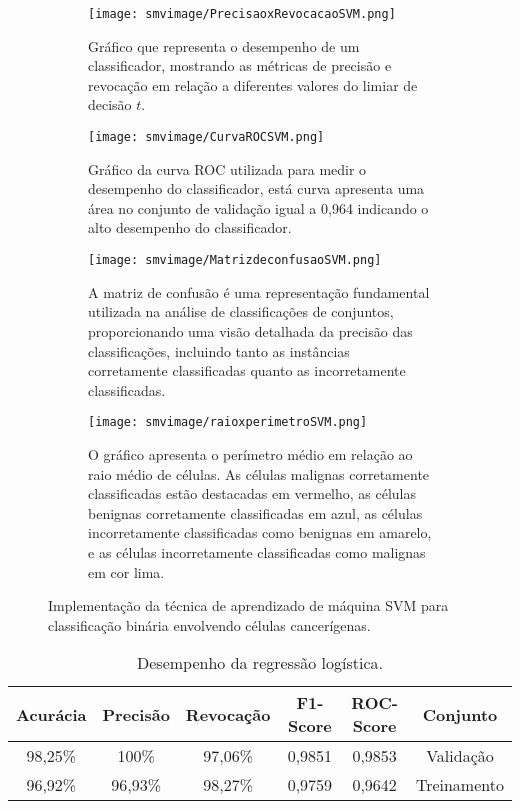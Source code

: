 \documentclass{pssbmac}
\begin{document}
\begin{figure}[H]
    \centering
    \begin{subfigure}[t]{0.49\textwidth}
        \centering
        \texttt{[image: smvimage/PrecisaoxRevocacaoSVM.png]}
        \caption{Gráfico que representa o desempenho de um classificador, mostrando as métricas de precisão e revocação em relação a diferentes valores do limiar de decisão $t$.}
        \label{subfig1svm}
    \end{subfigure}
    \hfill
    \begin{subfigure}[t]{0.49\textwidth}
        \centering
        \texttt{[image: smvimage/CurvaROCSVM.png]}
        \caption{Gráfico da curva ROC utilizada para medir o desempenho do classificador, está curva apresenta uma área no conjunto de validação igual a 0,964 indicando o alto desempenho do classificador.}
        \label{subfig2svm}
    \end{subfigure}
    \bigskip
    \begin{subfigure}[b]{0.49\textwidth}
        \centering
        \texttt{[image: smvimage/MatrizdeconfusaoSVM.png]}
        \caption{A matriz de confusão é uma representação fundamental utilizada na análise de classificações de conjuntos, proporcionando uma visão detalhada da precisão das classificações, incluindo tanto as instâncias corretamente classificadas quanto as incorretamente classificadas.}
        \label{subfig3svm}
    \end{subfigure}
    \hfill
    \begin{subfigure}[b]{0.49\textwidth}
        \centering
        \texttt{[image: smvimage/raioxperimetroSVM.png]}

        \caption{O gráfico apresenta o perímetro médio em relação ao raio médio de células. As células malignas corretamente classificadas estão destacadas em vermelho, as células benignas corretamente classificadas em azul, as células incorretamente classificadas como benignas em amarelo, e as células incorretamente classificadas como malignas em cor lima.}
        \label{subfig4svm}
    \end{subfigure}
    \caption{Implementação da técnica de aprendizado de máquina SVM para classificação binária envolvendo células cancerígenas.}
    \label{svm}
\end{figure}

\begin{table}[H]
\caption{ {\small Desempenho da regressão logística.}}
\centering
\begin{tabular}{cccccc}
\hline
Acurácia & Precisão  & Revocação & F1-Score & ROC-Score& Conjunto\\ \hline
98,25\%      & 100\%  & 97,06\%& 0,9851 &  0,9853 & Validação\\
96,92\%      & 96,93\%  & 98,27\%& 0,9759 &  0,9642 & Treinamento\\
\hline
\end{tabular}\label{tabela02}
\end{table}
\end{document}
